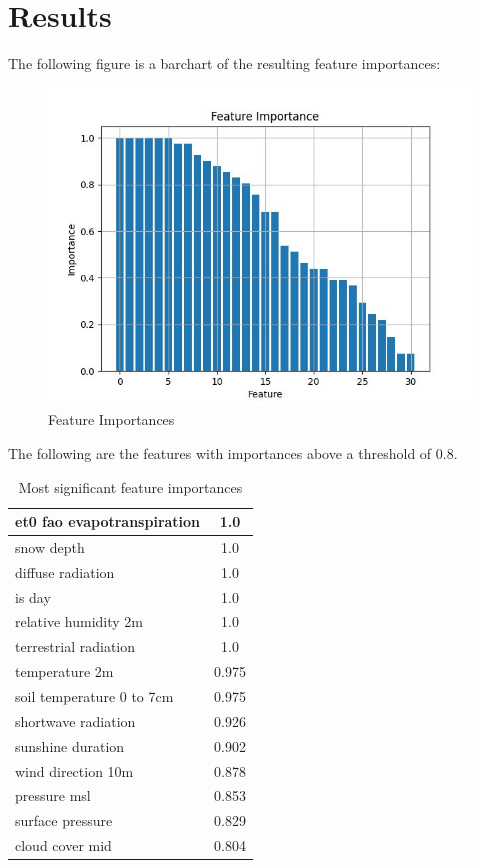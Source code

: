 \documentclass[12pt]{article}
\begin{document}
\section{Results}
The following figure is a barchart of the resulting feature importances:
\begin{figure}[!h]
  \includegraphics[scale=0.75]{images/feat_imp_barchart.jpg}
  \caption{Feature Importances}
  \centering
  \label{fig:fimp}
\end{figure}

The following are the features with importances above a threshold of 0.8.

\begin{table}[h!]
\centering
\begin{tabular}{|l|c|}
\hline
et0 fao evapotranspiration   &  1.0  \\ \hline
snow depth                   &  1.0  \\ \hline
diffuse radiation            &  1.0  \\ \hline
is day                       &  1.0  \\ \hline
relative humidity 2m         &  1.0  \\ \hline
terrestrial radiation        &  1.0  \\ \hline
temperature 2m               &  0.975  \\ \hline
soil temperature 0 to 7cm    &  0.975  \\ \hline
shortwave radiation          &  0.926  \\ \hline
sunshine duration            &  0.902  \\ \hline
wind direction 10m           &  0.878  \\ \hline
pressure msl                 &  0.853  \\ \hline
surface pressure             &  0.829  \\ \hline
cloud cover mid              &  0.804  \\ \hline

\end{tabular}
\caption{Most significant feature importances}
\label{tab:Top_fint}
\end{table}
\end{document}

